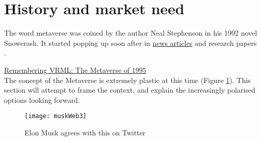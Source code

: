 
\section{History and market need}

The word metaverse was coined by the author Neal Stephenson in his 1992 novel Snowcrash. It started popping up soon after in \href{https://www.newscientist.com/article/mg14819994-000-how-to-build-a-metaverse/}{news articles} and research papers \cite{mclellan1993avatars}.

\href{https://techtelegraph.co.uk/remembering-vrml-the-metaverse-of-1995/}{Remembering VRML: The Metaverse of 1995}\\


The concept of the Metaverse is extremely plastic at this time (Figure \ref{fig:muskWeb3}). This section will attempt to frame the context, and explain the increasingly polarised options looking forward.\\

\begin{figure}
  \centering
    \texttt{[image: muskWeb3]}
  \caption{Elon Musk agrees with this on Twitter}
  \label{fig:muskWeb3}
\end{figure}


